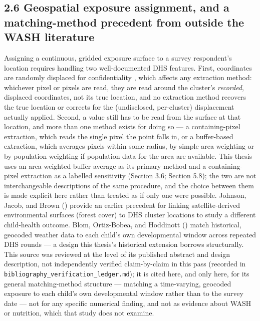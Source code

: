 \subsection*{2.6 Geospatial exposure assignment, and a matching-method precedent from outside the WASH literature}

Assigning a continuous, gridded exposure surface to a survey respondent's location requires handling two well-documented DHS features. First, coordinates are randomly displaced for confidentiality \parencite{Burgert2013,PerezHeydrich2013}, which affects any extraction method: whichever pixel or pixels are read, they are read around the cluster's \textit{recorded}, displaced coordinates, not its true location, and no extraction method recovers the true location or corrects for the (undisclosed, per-cluster) displacement actually applied. Second, a value still has to be read from the surface at that location, and more than one method exists for doing so --- a containing-pixel extraction, which reads the single pixel the point falls in, or a buffer-based extraction, which averages pixels within some radius, by simple area weighting or by population weighting if population data for the area are available. This thesis uses an area-weighted buffer average as its primary method and a containing-pixel extraction as a labelled sensitivity (Section 3.6; Section 5.8); the two are not interchangeable descriptions of the same procedure, and the choice between them is made explicit here rather than treated as if only one were possible. Johnson, Jacob, and Brown (\citeyear{JohnsonJacobBrown2013}) provide an earlier precedent for linking satellite-derived environmental surfaces (forest cover) to DHS cluster locations to study a different child-health outcome. Blom, Ortiz-Bobea, and Hoddinott (\citeyear{Blom2022}) match historical, geocoded weather data to each child's own developmental window across repeated DHS rounds --- a design this thesis's historical extension borrows structurally. This source was reviewed at the level of its published abstract and design description, not independently verified claim-by-claim in this pass (recorded in \texttt{bibliography\_\allowbreak{}verification\_\allowbreak{}ledger.\allowbreak{}md}); it is cited here, and only here, for its general matching-method structure --- matching a time-varying, geocoded exposure to each child's own developmental window rather than to the survey date --- not for any specific numerical finding, and not as evidence about WASH or nutrition, which that study does not examine.

